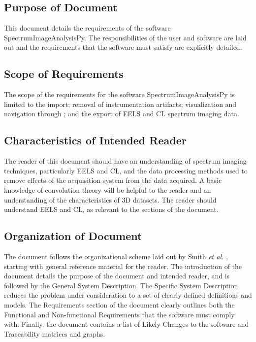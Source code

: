 \documentclass[12pt]{article}
\newcommand{\progname}{SpectrumImageAnalysisPy} %
\begin{document}
\subsection{Purpose of Document}

This document details the requirements of the software \progname{}. The
responsibilities of the user and software are laid out and the requirements that
the software must satisfy are explicitly detailed.

\subsection{Scope of Requirements} 
The scope of the requirements for the software \progname{} is limited to the
import; removal of instrumentation artifacts; visualization and navigation
through ; and the export of EELS and CL spectrum imaging data.

\subsection{Characteristics of Intended Reader} 
The reader of this document should have an understanding of spectrum imaging
techniques, particularly EELS and CL, and the data processing methods used to
remove effects of the acquisition system from the data acquired. A basic
knowledge of convolution theory will be helpful to the reader and an
understanding of the characteristics of 3D datasets. The reader should
understand EELS and CL, as relevant to the sections of the document.  

\subsection{Organization of Document}

The document follows the organizational scheme laid out by Smith \textit{et al.}
\cite{SmithAndLai2005, smith_requirements_2007}, starting with general reference
material for the reader. The introduction of the document details the purpose of
the document and intended reader, and is followed by the General System
Description. The Specific System Description reduces the problem under
consideration to a set of clearly defined definitions and models. The
Requirements section of the document clearly outlines both the Functional and
Non-functional Requirements that the software must comply with. Finally, the
document contains a list of Likely Changes to the software and Traceability
matrices and graphs.
\end{document}
